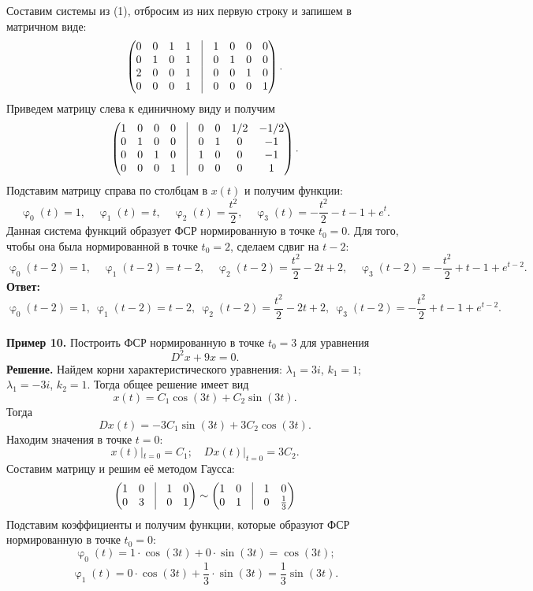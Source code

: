 \documentclass[a4paper, 12pt]{article}
\renewcommand{\varphi}{\upvarphi}
\begin{document}
Составим системы из (1), отбросим из них первую строку и запишем в матричном виде:
$$\begin{pmatrix}
	0 & 0 & 1 & 1 & \vline & 1 & 0 & 0 & 0\\
	0 & 1 & 0 & 1 & \vline & 0 & 1 & 0 & 0\\
	2 & 0 & 0 & 1 & \vline & 0 & 0 & 1 & 0\\
	0 & 0 & 0 & 1 & \vline & 0 & 0 & 0 & 1
\end{pmatrix}.$$
Приведем матрицу слева к единичному виду и получим
$$\begin{pmatrix}
	1 & 0 & 0 & 0 & \vline & 0 & 0 & 1/2 & -1/2\\
	0 & 1 & 0 & 0 & \vline & 0 & 1 & 0 & -1\\
	0 & 0 & 1 & 0 & \vline & 1 & 0 & 0 & -1\\
	0 & 0 & 0 & 1 & \vline & 0 & 0 & 0 & 1
\end{pmatrix}.$$
Подставим матрицу справа по столбцам в $x(t)$ и получим функции:
$$\varphi_0(t) = 1,\quad \varphi_1(t) = t,\quad \varphi_2(t) = \dfrac{t^2}{2},\quad \varphi_3(t) = -\dfrac{t^2}{2} - t - 1 + e^t.$$
Данная система функций образует ФСР нормированную в точке $t_0 = 0$. Для того, чтобы она была нормированной в точке $t_0 = 2$, сделаем сдвиг на $t-2$:
$$\varphi_0(t-2) = 1,\quad \varphi_1(t-2) = t-2,\quad \varphi_2(t-2) = \dfrac{t^2}{2}-2t+2,\quad \varphi_3(t-2) = -\dfrac{t^2}{2} + t - 1 + e^{t-2}.$$
\textbf{Ответ:} $\varphi_0(t-2) = 1,\ \varphi_1(t-2) = t-2,\ \varphi_2(t-2) = \dfrac{t^2}{2}-2t+2,\ \varphi_3(t-2) = -\dfrac{t^2}{2} + t - 1 + e^{t-2}.$
\\\\
\textbf{Пример 10.} Построить ФСР нормированную в точке $t_0 = 3$ для уравнения $$D^2x + 9x = 0.$$
	\textbf{Решение.} Найдем корни характеристического уравнения: $\lambda_1 = 3i$, $k_1 = 1$; $\lambda_1 = -3i$, $k_2 = 1$. Тогда общее решение имеет вид $$x(t) = C_1\cos(3t) + C_2\sin(3t).$$
 Тогда $$Dx(t) = -3C_1\sin(3t) + 3C_2\cos(3t).$$ Находим значения в точке $t =0$:
	$$x(t)|_{t = 0} = C_1;\quad Dx(t)|_{t = 0} = 3C_2.$$ Составим матрицу и решим её методом Гаусса:
	$$\begin{pmatrix}
		1 & 0 & \vline & 1 & 0\\
		0 & 3 & \vline & 0 & 1
	\end{pmatrix}\sim \begin{pmatrix}
	1 & 0 & \vline & 1 & 0\\
	0 & 1 & \vline & 0 & \frac{1}{3}
\end{pmatrix}$$
 Подставим коэффициенты и получим функции, которые образуют ФСР нормированную в точке $t_0 = 0$: $$\varphi_0(t) = 1\cdot \cos(3t) + 0\cdot \sin (3t) = \cos(3t);$$ $$\varphi_1(t) = 0\cdot \cos(3t) + \dfrac{1}{3}\cdot \sin (3t) = \dfrac{1}{3}\sin(3t).$$
\end{document}
